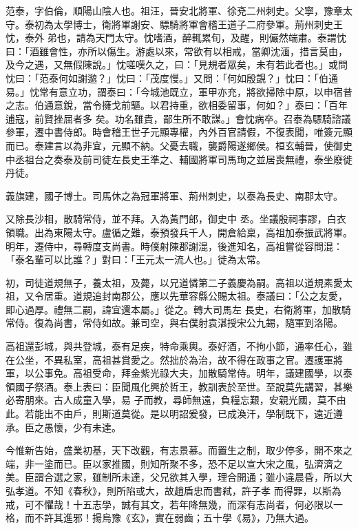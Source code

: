 
\begin{pinyinscope}

 范泰，字伯倫，順陽山陰人也。祖汪，晉安北將軍、徐兗二州刺史。父寧，豫章太守。泰初為太學博士，衛將軍謝安、驃騎將軍會稽王道子二府參軍。荊州刺史王忱，泰外
 弟也，請為天門太守。忱嗜酒，醉輒累旬，及醒，則儼然端肅。泰謂忱曰：「酒雖會性，亦所以傷生。游處以來，常欲有以相戒，當卿沈湎，措言莫由，及今之遇，又無假陳說。」忱嗟嘆久之，曰：「見規者眾矣，未有若此者也。」或問忱曰：「范泰何如謝邈？」忱曰：「茂度慢。」又問：「何如殷覬？」忱曰：「伯通易。」忱常有意立功，謂泰曰：「今城池既立，軍甲亦充，將欲掃除中原，以申宿昔之志。伯通意銳，當令擁戈前驅。以君持重，欲相委留事，何如？」泰曰：「百年逋寇，前賢挫屈者多
 矣。功名雖貴，鄙生所不敢謀。」會忱病卒。召泰為驃騎諮議參軍，遷中書侍郎。時會稽王世子元顯專權，內外百官請假，不復表聞，唯簽元顯而已。泰建言以為非宜，元顯不納。父憂去職，襲爵陽遂鄉侯。桓玄輔晉，使御史中丞祖台之奏泰及前司徒左長史王準之、輔國將軍司馬珣之並居喪無禮，泰坐廢徙丹徒。



 義旗建，國子博士。司馬休之為冠軍將軍、荊州刺史，以泰為長史、南郡太守。



 又除長沙相，散騎常侍，並不拜。入為黃門郎，御史中
 丞。坐議殷祠事謬，白衣領職。出為東陽太守。盧循之難，泰預發兵千人，開倉給稟，高祖加泰振武將軍。明年，遷侍中，尋轉度支尚書。時僕射陳郡謝混，後進知名，高祖嘗從容問混：「泰名輩可以比誰？」對曰：「王元太一流人也。」徙為太常。



 初，司徒道規無子，養太祖，及薨，以兄道憐第二子義慶為嗣。高祖以道規素愛太祖，又令居重。道規追封南郡公，應以先華容縣公賜太祖。泰議曰：「公之友愛，即心過厚。禮無二嗣，諱宜還本屬。」從之。轉大司馬左
 長史，右衛將軍，加散騎常侍。復為尚書，常侍如故。兼司空，與右僕射袁湛授宋公九錫，隨軍到洛陽。



 高祖還彭城，與共登城，泰有足疾，特命乘輿。泰好酒，不拘小節，通率任心，雖在公坐，不異私室，高祖甚賞愛之。然拙於為治，故不得在政事之官。遷護軍將軍，以公事免。高祖受命，拜金紫光祿大夫，加散騎常侍。明年，議建國學，以泰領國子祭酒。泰上表曰：臣聞風化興於哲王，教訓表於至世。至說莫先講習，甚樂必寄朋來。古人成童入學，易
 子而教，尋師無遠，負糧忘艱，安親光國，莫不由此。若能出不由戶，則斯道莫從。是以明詔爰發，已成渙汗，學制既下，遠近遵承。臣之愚懷，少有未達。



 今惟新告始，盛業初基，天下改觀，有志景慕。而置生之制，取少停多，開不來之端，非一塗而已。臣以家推國，則知所聚不多，恐不足以宣大宋之風，弘濟濟之美。臣謂合選之家，雖制所未達，父兄欲其入學，理合開通；雖小違晨昏，所以大弘孝道。不知《春秋》，則所陷或大，故趙盾忠而書弒，許子孝
 而得罪，以斯為戒，可不懼哉！十五志學，誠有其文，若年降無幾，而深有志尚者，何必限以一格，而不許其進邪！揚烏豫《玄》，實在弱齒；五十學《易》，乃無大過。




\end{pinyinscope}
